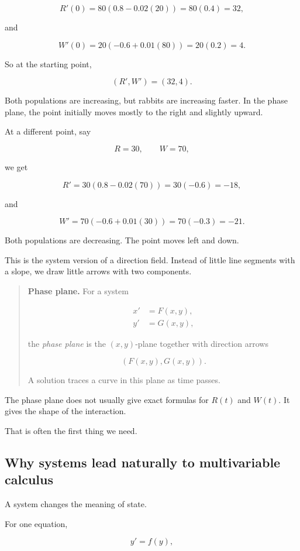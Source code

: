 \[
R'(0)=80(0.8-0.02(20))=80(0.4)=32,
\]

and

\[
W'(0)=20(-0.6+0.01(80))=20(0.2)=4.
\]

So at the starting point,

\[
(R',W')=(32,4).
\]

Both populations are increasing, but rabbits are increasing faster.  In the phase plane,
the point initially moves mostly to the right and slightly upward.

At a different point, say

\[
R=30,\qquad W=70,
\]

we get

\[
R'=30(0.8-0.02(70))=30(-0.6)=-18,
\]

and

\[
W'=70(-0.6+0.01(30))=70(-0.3)=-21.
\]

Both populations are decreasing.  The point moves left and down.

This is the system version of a direction field.  Instead of little line segments with a
slope, we draw little arrows with two components.

\begin{quote}
\textbf{Phase plane.}
For a system

\[
\begin{aligned}
x'&=F(x,y),\\
y'&=G(x,y),
\end{aligned}
\]

the \emph{phase plane} is the \((x,y)\)-plane together with direction arrows

\[
(F(x,y),G(x,y)).
\]

A solution traces a curve in this plane as time passes.
\end{quote}

The phase plane does not usually give exact formulas for \(R(t)\) and \(W(t)\).  It gives
the shape of the interaction.

That is often the first thing we need.

\subsection{Why systems lead naturally to multivariable calculus}
\label{subsec:systems-lead-to-multivariable-calculus}

A system changes the meaning of state.

For one equation,

\[
y'=f(y),
\]

